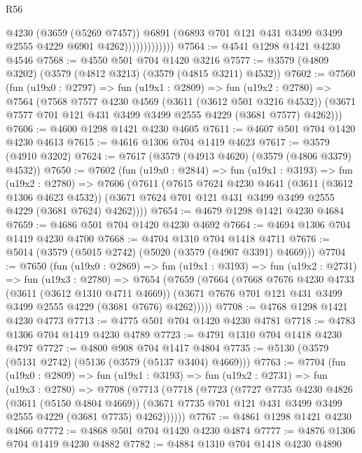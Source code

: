 \begin{lexlean}{R56}
\begin{coremodule}
                            @4230
                            (@3659 (@5269 @7457))
                            @6891
                            (@6893 @701 @121 @431 @3499 @3499 @2555 @4229 @6901 @4262)))))))))))))
@7564 := @4541 @1298 @1421 @4230 @4546
@7568 := @4550 @501 @704 @1420 @3216
@7577 := @3579 (@4809 @3202) (@3579 (@4812 @3213) (@3579 (@4815 @3211) @4532))
@7602 := @7560
    (fun (u19x0 : @2797) =>
    fun (u19x1 : @2809) =>
    fun (u19x2 : @2780) =>
    @7564
      (@7568
        @7577
        @4230
        @4569
        (@3611 (@3612 @501 @3216 @4532))
        (@3671 @7577 @701 @121 @431 @3499 @3499 @2555 @4229 (@3681 @7577) @4262)))
@7606 := @4600 @1298 @1421 @4230 @4605
@7611 := @4607 @501 @704 @1420 @4230 @4613
@7615 := @4616 @1306 @704 @1419 @4623
@7617 := @3579 (@4910 @3202)
@7624 := @7617 (@3579 (@4913 @4620) (@3579 (@4806 @3379) @4532))
@7650 := @7602
    (fun (u19x0 : @2844) =>
    fun (u19x1 : @3193) =>
    fun (u19x2 : @2780) =>
    @7606
      (@7611
        (@7615
          @7624
          @4230
          @4641
          (@3611 (@3612 @1306 @4623 @4532))
          (@3671 @7624 @701 @121 @431 @3499 @3499 @2555 @4229 (@3681 @7624) @4262))))
@7654 := @4679 @1298 @1421 @4230 @4684
@7659 := @4686 @501 @704 @1420 @4230 @4692
@7664 := @4694 @1306 @704 @1419 @4230 @4700
@7668 := @4704 @1310 @704 @1418 @4711
@7676 := @5014 (@3579 (@5015 @2742) (@5020 (@3579 (@4907 @3391) @4669)))
@7704 := @7650
    (fun (u19x0 : @2869) =>
    fun (u19x1 : @3193) =>
    fun (u19x2 : @2731) =>
    fun (u19x3 : @2780) =>
    @7654
      (@7659
        (@7664
          (@7668
            @7676
            @4230
            @4733
            (@3611 (@3612 @1310 @4711 @4669))
            (@3671 @7676 @701 @121 @431 @3499 @3499 @2555 @4229 (@3681 @7676) @4262)))))
@7708 := @4768 @1298 @1421 @4230 @4773
@7713 := @4775 @501 @704 @1420 @4230 @4781
@7718 := @4783 @1306 @704 @1419 @4230 @4789
@7723 := @4791 @1310 @704 @1418 @4230 @4797
@7727 := @4800 @908 @704 @1417 @4804
@7735 := @5130 (@3579 (@5131 @2742) (@5136 (@3579 (@5137 @3404) @4669)))
@7763 := @7704
    (fun (u19x0 : @2809) =>
    fun (u19x1 : @3193) =>
    fun (u19x2 : @2731) =>
    fun (u19x3 : @2780) =>
    @7708
      (@7713
        (@7718
          (@7723
            (@7727
              @7735
              @4230
              @4826
              (@3611 (@5150 @4804 @4669))
              (@3671 @7735 @701 @121 @431 @3499 @3499 @2555 @4229 (@3681 @7735) @4262))))))
@7767 := @4861 @1298 @1421 @4230 @4866
@7772 := @4868 @501 @704 @1420 @4230 @4874
@7777 := @4876 @1306 @704 @1419 @4230 @4882
@7782 := @4884 @1310 @704 @1418 @4230 @4890

\end{coremodule}
\end{lexlean}
